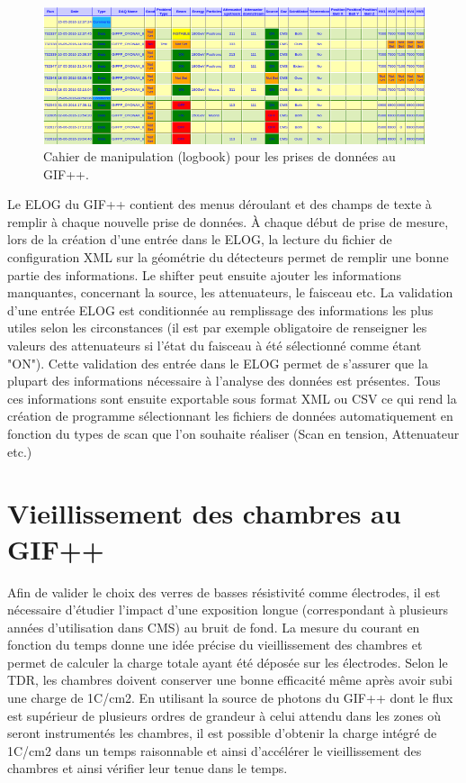 \begin{figure}[!ht]
	\centering
	\includegraphics[width=0.98\linewidth]{GLA/ELOG2.png}
	\caption{Cahier de manipulation (logbook) pour les prises de données au GIF++.}
	\label{ELOG}
\end{figure}

Le ELOG du GIF++ contient des menus déroulant et des champs de texte à remplir à chaque nouvelle prise de données. À chaque début de prise de mesure, lors de la création d'une entrée dans le ELOG, la lecture du fichier de configuration XML sur la géométrie du détecteurs permet de remplir une bonne partie des informations. Le shifter peut ensuite ajouter les informations manquantes, concernant la source, les attenuateurs, le faisceau etc. La validation d'une entrée ELOG est conditionnée au remplissage des informations les plus utiles selon les circonstances (il est par exemple obligatoire de renseigner les valeurs des attenuateurs si l'état du faisceau à été sélectionné comme étant "ON"). Cette validation des entrée dans le ELOG permet de s'assurer que la plupart des informations nécessaire à l'analyse des données est présentes. Tous ces informations sont ensuite exportable sous format XML ou CSV ce qui rend la création de programme sélectionnant les fichiers de données automatiquement en fonction du types de scan que l'on souhaite réaliser (Scan en tension, Attenuateur etc.)


\section{Vieillissement des chambres au GIF++}
Afin de valider le choix des verres de basses résistivité comme électrodes, il est nécessaire d'étudier l'impact d'une exposition longue (correspondant à plusieurs années d'utilisation dans CMS) au bruit de fond. La mesure du courant en fonction du temps donne une idée précise du vieillissement des chambres et permet de calculer la charge totale ayant été déposée sur les électrodes. Selon le TDR, les chambres doivent conserver une bonne efficacité même après avoir subi une charge de 1C/cm2. En utilisant la source de photons du GIF++ dont le flux est supérieur de plusieurs ordres de grandeur à celui attendu dans les zones où seront instrumentés les chambres, il est possible d'obtenir la charge intégré de 1C/cm2 dans un temps raisonnable et ainsi d'accélérer le vieillissement des chambres et ainsi vérifier leur tenue dans le temps.

